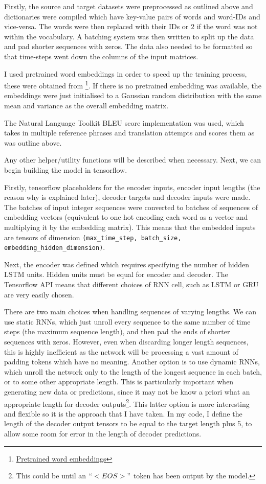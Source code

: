 \documentclass[]{article}
\begin{document}
Firstly, the source and target datasets were preprocessed as outlined above and dictionaries were compiled which have key-value pairs of words and word-IDs and vice-versa. The words were then replaced with their IDs or $2$ if the word was not within the vocabulary. A batching system was then written to split up the data and pad shorter sequences with zeros. The data also needed to be formatted so that time-steps went down the columns of the input matrices.

I used pretrained word embeddings in order to speed up the training process, these were obtained from  \footnote{\href{https://sites.google.com/site/rmyeid/projects/polyglot\#TOC-Download-the-Embeddings}{Pretrained word embeddings}}. If there is no pretrained embedding was available, the embeddings were just initialised to a Gaussian random distribution with the same mean and variance as the overall embedding matrix.

The Natural Language Toolkit BLEU score implementation was used, which takes in multiple reference phrases and translation attempts and scores them as was outline above.
	
Any other helper/utility functions will be described when necessary. Next, we can begin building the model in tensorflow.

Firstly, tensorflow placeholders for the encoder inputs, encoder input lengths (the reason why is explained later), decoder targets and decoder inputs were made. The batches of input integer sequences were converted to batches of sequences of embedding vectors (equivalent to one hot encoding each word as a vector and multiplying it by the embedding matrix). This means that the embedded inputs are tensors of dimension \lstinline{(max_time_step, batch_size, embedding_hidden_dimension)}.

Next, the encoder was defined which requires specifying the number of hidden LSTM units. Hidden units must be equal for encoder and decoder. The Tensorflow API means that different choices of RNN cell, such as LSTM or GRU are very easily chosen.

There are two main choices when handling sequences of varying lengths. We can use static RNNs, which just unroll every sequence to the same number of time steps (the maximum sequence length), and then pad the ends of shorter sequences with zeros. However, even when discarding longer length sequences, this is highly inefficient as the network will be processing a vast amount of padding tokens which have no meaning. Another option is to use dynamic RNNs, which unroll the network only to the length of the longest sequence in each batch, or to some other appropriate length. This is particularly important when generating new data or predictions, since it may not be know a priori what an appropriate length for decoder outputs\footnote{This could be until an $``<EOS>"$ token has been output by the model.}. This latter option is more interesting and flexible so it is the approach that I have taken. In my code, I define the length of the decoder output tensors to be equal to the target length plus 5, to allow some room for error in the length of decoder predictions.
\end{document}
